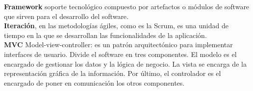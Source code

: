 
\renewcommand*{\arraystretch}{1.5}

\textbf{Framework} soporte tecnológico compuesto por artefactos o módulos de software que sirven para el desarrollo del software.\\




\textbf{Iteración}, en las metodologías ágiles, como es la Scrum, es una unidad de tiempo en la que se desarrollan las funcionalidades de la aplicación.\\




\textbf{ MVC}  Model-view-controller: es un patrón arquitectónico para implementar interfaces
de usuario. Divide el software en tres componentes. El modelo
es el encargado de gestionar los datos y la lógica de negocio. La vista
se encarga de la representación gráfica de la información. Por último, el
controlador es el encargado de poner en comunicación los otros componentes.





